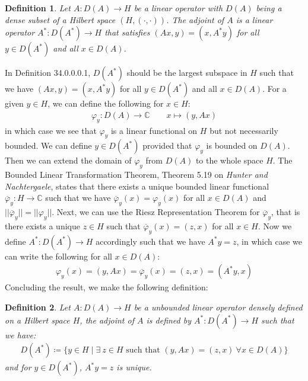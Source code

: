 \documentclass[11pt]{book}
\theoremstyle{break}
\theoremstyle{break}
\newtheorem{defn}{Definition}[corL]
\newcommand{\C}{\mathbb{C}}
\newcommand{\txt}{\textit{Hunter and Nachtergaele}}
\begin{document}
\begin{defn}
Let $A:D(A) \to H$ be a linear operator with $D(A)$ being a dense subset of a Hilbert space $(H,(\cdot,\cdot))$. The adjoint of $A$ is a linear operator $A^*:D(A^*) \to H $ that satisfies $(Ax,y) = (x,A^*y)$ for all $y\in D(A^*)$ and all $x \in D(A)$.
\end{defn}
In Definition 34.0.0.0.1, $D(A^*)$ should be the largest subspace in $H$ such that we have $(Ax,y) = (x,A^*y)$ for all $y\in D(A^*)$ and all $x \in D(A)$. For a given $y \in H$, we can define the following for $x \in H$:
\begin{align*}
\varphi_y:D(A) \to \C \qquad x\mapsto (y,Ax)
\end{align*}
in which case we see that $\varphi_y$ is a linear functional on $H$ but not necessarily bounded. We can define $y\in D(A^*)$ provided that $\varphi_y$ is bounded on $D(A)$. Then we can extend the domain of $\varphi_y$ from $D(A)$ to the whole space $H$. The Bounded Linear Transformation Theorem, Theorem 5.19 on \txt, states that there exists a unique bounded linear functional $\overline{\varphi}_y:H \to \C$ such that we have $\overline{\varphi}_y (x) = \varphi_y(x)$ for all $x \in D(A)$ and $||\overline{\varphi}_y|| = ||\varphi_y||$. Next, we can use the Riesz Representation Theorem for $\overline{\varphi}_y$, that is there exists a unique $z \in H$ such that $\overline{\varphi}_y(x) = (z,x)$ for all $x \in H$. Now we define $A^*:D(A^*) \to H$ accordingly such that we have $A^*y = z$, in which case we can write the following for all $x \in D(A)$:
\begin{align*}
\varphi_y(x) = (y,Ax) = \overline{\varphi}_y(x) = (z,x) = (A^*y, x)
\end{align*}
Concluding the result, we make the following definition:
\begin{defn}
Let $A:D(A)\to H$ be a unbounded linear operator densely defined on a Hilbert space $H$, the adjoint of $A$ is defined by $A^*: D(A^*)\to H$ such that we have:
\begin{align*}
D(A^*) \coloneqq \{ y \in H \mid \exists\ z \in H \text{ such that }(y,Ax) = (z,x) \ \forall x \in D(A)\}
\end{align*}
and for $y \in D(A^*)$, $A^*y =z$ is unique. 
\end{defn}
\end{document}
